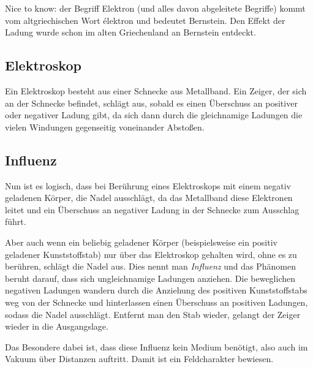\begin{leftbar}
Nice to know: der Begriff Elektron (und alles davon abgeleitete Begriffe) kommt vom altgriechischen Wort \glqq élektron\grqq{} und bedeutet \glqq Bernstein\grqq . Den Effekt der Ladung wurde schon im alten Griechenland an Bernstein entdeckt.
\end{leftbar}


\subsection{Elektroskop}

Ein Elektroskop besteht aus einer Schnecke aus Metallband. Ein Zeiger, der sich an der Schnecke befindet, schlägt aus, sobald es einen Überschuss an positiver oder negativer Ladung gibt, da sich dann durch die gleichnamige Ladungen die vielen Windungen gegenseitig voneinander Abstoßen.

\subsection{Influenz} \label{subsec:Influenz}

Nun ist es logisch, dass bei Berührung eines Elektroskops mit einem negativ geladenen Körper, die Nadel ausschlägt, da das Metallband diese Elektronen leitet und ein Überschuss an negativer Ladung in der Schnecke zum Ausschlag führt.

Aber auch wenn ein beliebig geladener Körper (beispielsweise ein positiv geladener Kunststoffstab) nur über das Elektroskop gehalten wird, ohne es zu berühren, schlägt die Nadel aus. Dies nennt man \emph{Influenz} und das Phänomen beruht darauf, dass sich ungleichnamige Ladungen anziehen. Die beweglichen negativen Ladungen wandern durch die Anziehung des positiven Kunststoffstabs weg von der Schnecke und hinterlassen einen Überschuss an positiven Ladungen, sodass die Nadel ausschlägt. Entfernt man den Stab wieder, gelangt der Zeiger wieder in die Ausgangslage.

Das Besondere dabei ist, dass diese Influenz kein Medium benötigt, also auch im Vakuum über Distanzen auftritt. Damit ist ein Feldcharakter bewiesen.

